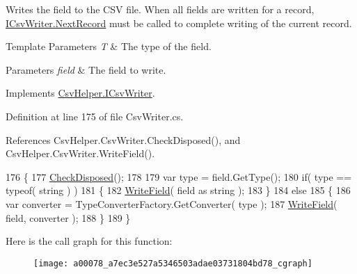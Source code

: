 Writes the field to the C\-S\-V file. When all fields are written for a record, \hyperlink{a00112_a6bb1687959808ea1219fa68e7f3060fa}{I\-Csv\-Writer.\-Next\-Record} must be called to complete writing of the current record. 


\begin{DoxyTemplParams}{Template Parameters}
{\em T} & The type of the field.\\
\hline
\end{DoxyTemplParams}

\begin{DoxyParams}{Parameters}
{\em field} & The field to write.\\
\hline
\end{DoxyParams}


Implements \hyperlink{a00112_ae9b669ef98e0c3ac3b2eb2345b9f095e}{Csv\-Helper.\-I\-Csv\-Writer}.



Definition at line 175 of file Csv\-Writer.\-cs.



References Csv\-Helper.\-Csv\-Writer.\-Check\-Disposed(), and Csv\-Helper.\-Csv\-Writer.\-Write\-Field().


\begin{DoxyCode}
176         \{
177             \hyperlink{a00078_a15e26ec8c5c935030677bee9a36d7c16}{CheckDisposed}();
178 
179             var type = field.GetType();
180             \textcolor{keywordflow}{if}( type == typeof( \textcolor{keywordtype}{string} ) )
181             \{
182                 \hyperlink{a00078_a994d9b339c4cda8bf83d5665b5c4ff1a}{WriteField}( field as \textcolor{keywordtype}{string} );
183             \}
184             \textcolor{keywordflow}{else}
185             \{
186                 var converter = TypeConverterFactory.GetConverter( type );
187                 \hyperlink{a00078_a994d9b339c4cda8bf83d5665b5c4ff1a}{WriteField}( field, converter );
188             \}
189         \}
\end{DoxyCode}


Here is the call graph for this function\-:
\nopagebreak
\begin{figure}[H]
\begin{center}
\leavevmode
\texttt{[image: a00078\_a7ec3e527a5346503adae03731804bd78\_cgraph]}
\end{center}
\end{figure}


